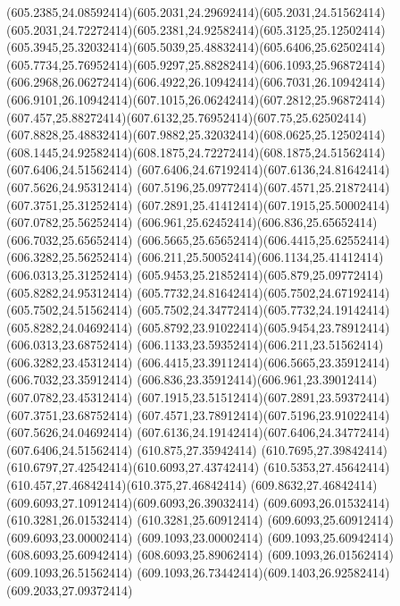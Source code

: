 {{	\curveto(605.2385,24.08592414)(605.2031,24.29692414)(605.2031,24.51562414)
	\curveto(605.2031,24.72272414)(605.2381,24.92582414)(605.3125,25.12502414)
	\curveto(605.3945,25.32032414)(605.5039,25.48832414)(605.6406,25.62502414)
	\curveto(605.7734,25.76952414)(605.9297,25.88282414)(606.1093,25.96872414)
	\curveto(606.2968,26.06272414)(606.4922,26.10942414)(606.7031,26.10942414)
	\curveto(606.9101,26.10942414)(607.1015,26.06242414)(607.2812,25.96872414)
	\curveto(607.457,25.88272414)(607.6132,25.76952414)(607.75,25.62502414)
	\curveto(607.8828,25.48832414)(607.9882,25.32032414)(608.0625,25.12502414)
	\curveto(608.1445,24.92582414)(608.1875,24.72272414)(608.1875,24.51562414)
	\closepath
	\moveto(607.6406,24.51562414)
	\curveto(607.6406,24.67192414)(607.6136,24.81642414)(607.5626,24.95312414)
	\curveto(607.5196,25.09772414)(607.4571,25.21872414)(607.3751,25.31252414)
	\curveto(607.2891,25.41412414)(607.1915,25.50002414)(607.0782,25.56252414)
	\curveto(606.961,25.62452414)(606.836,25.65652414)(606.7032,25.65652414)
	\curveto(606.5665,25.65652414)(606.4415,25.62552414)(606.3282,25.56252414)
	\curveto(606.211,25.50052414)(606.1134,25.41412414)(606.0313,25.31252414)
	\curveto(605.9453,25.21852414)(605.879,25.09772414)(605.8282,24.95312414)
	\curveto(605.7732,24.81642414)(605.7502,24.67192414)(605.7502,24.51562414)
	\curveto(605.7502,24.34772414)(605.7732,24.19142414)(605.8282,24.04692414)
	\curveto(605.8792,23.91022414)(605.9454,23.78912414)(606.0313,23.68752414)
	\curveto(606.1133,23.59352414)(606.211,23.51562414)(606.3282,23.45312414)
	\curveto(606.4415,23.39112414)(606.5665,23.35912414)(606.7032,23.35912414)
	\curveto(606.836,23.35912414)(606.961,23.39012414)(607.0782,23.45312414)
	\curveto(607.1915,23.51512414)(607.2891,23.59372414)(607.3751,23.68752414)
	\curveto(607.4571,23.78912414)(607.5196,23.91022414)(607.5626,24.04692414)
	\curveto(607.6136,24.19142414)(607.6406,24.34772414)(607.6406,24.51562414)
	\closepath
	\moveto(610.875,27.35942414)
	\curveto(610.7695,27.39842414)(610.6797,27.42542414)(610.6093,27.43742414)
	\curveto(610.5353,27.45642414)(610.457,27.46842414)(610.375,27.46842414)
	\curveto(609.8632,27.46842414)(609.6093,27.10912414)(609.6093,26.39032414)
	\lineto(609.6093,26.01532414)
	\lineto(610.3281,26.01532414)
	\lineto(610.3281,25.60912414)
	\lineto(609.6093,25.60912414)
	\lineto(609.6093,23.00002414)
	\lineto(609.1093,23.00002414)
	\lineto(609.1093,25.60942414)
	\lineto(608.6093,25.60942414)
	\lineto(608.6093,25.89062414)
	\lineto(609.1093,26.01562414)
	\lineto(609.1093,26.51562414)
	\curveto(609.1093,26.73442414)(609.1403,26.92582414)(609.2033,27.09372414)
}}
